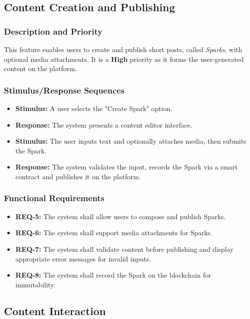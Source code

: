 \documentclass[a4paper,12pt]{article}
\begin{document}
\subsection{Content Creation and Publishing}
\subsubsection{Description and Priority}
This feature enables users to create and publish short posts, called \textit{Sparks}, with optional media attachments. It is a \textbf{High} priority as it forms the user-generated content on the platform.

\subsubsection{Stimulus/Response Sequences}
\begin{itemize}
    \item \textbf{Stimulus:} A user selects the "Create Spark" option.
    \item \textbf{Response:} The system presents a content editor interface.
    \item \textbf{Stimulus:} The user inputs text and optionally attaches media, then submits the Spark.
    \item \textbf{Response:} The system validates the input, records the Spark via a smart contract and publishes it on the platform.
\end{itemize}

\subsubsection{Functional Requirements}
\begin{itemize}
    \item \textbf{REQ-5:} The system shall allow users to compose and publish Sparks.
    \item \textbf{REQ-6:} The system shall support media attachments for Sparks.
    \item \textbf{REQ-7:} The system shall validate content before publishing and display appropriate error messages for invalid inputs.
    \item \textbf{REQ-8:} The system shall record the Spark on the blockchain for immutability.
\end{itemize}

\subsection{Content Interaction}
\end{document}
